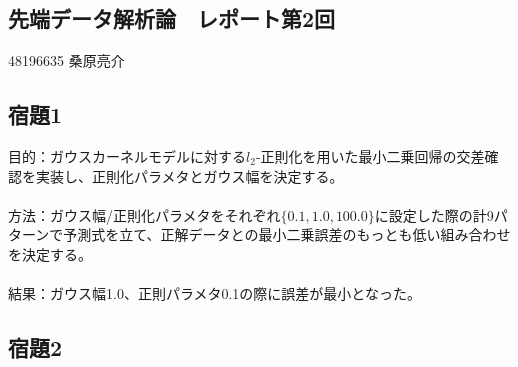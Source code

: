 \documentclass{article}
\begin{document}
\begin{center}
\section*{先端データ解析論　レポート第2回}
48196635 桑原亮介
\end{center}

\subsection*{宿題1}
目的：ガウスカーネルモデルに対する$l_{2}$-正則化を用いた最小二乗回帰の交差確認を実装し、正則化パラメタとガウス幅を決定する。\\
\noindent \\
方法：ガウス幅/正則化パラメタをそれぞれ$\{0.1,1.0,100.0\}$に設定した際の計9パターンで予測式を立て、正解データとの最小二乗誤差のもっとも低い組み合わせを決定する。\\
\noindent \\
結果：ガウス幅1.0、正則パラメタ0.1の際に誤差が最小となった。\\



\subsection*{宿題2}
\end{document}
